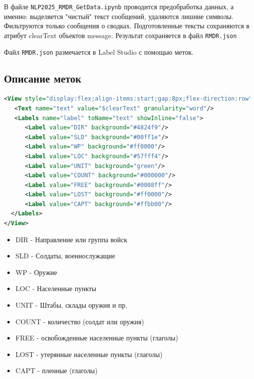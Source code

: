 \documentclass{article}
\begin{document}
В файле \verb|NLP2025_RMDR_GetData.ipynb| проводится предобработка данных, а именно: выделяется "чистый" текст сообщений, удаляются лишние символы. Фильтруются только сообщения о сводках. Подготовленные тексты сохраняются в атрибут clearText объектов message. Результат сохраняется в файл \verb|RMDR.json|

Файл \verb|RMDR.json| размечается в Label Studio с помощью меток.

\subsection*{Описание меток}



\begin{lstlisting}[language=XML]
<View style="display:flex;align-items:start;gap:8px;flex-direction:row">
   <Text name="text" value="$clearText" granularity="word"/>
   <Labels name="label" toName="text" showInline="false">
      <Label value="DIR" background="#4824f9"/>
      <Label value="SLD" background="#00ff1e"/>
      <Label value="WP" background="#ff0000"/>
      <Label value="LOC" background="#57fff4"/>
      <Label value="UNIT" background="green"/>
      <Label value="COUNT" background="#000000"/>
      <Label value="FREE" background="#0008ff"/>
      <Label value="LOST" background="#ff0000"/>
      <Label value="CAPT" background="#ffbb00"/>
  </Labels>
</View>
\end{lstlisting}



\begin{itemize}
  \item DIR - Направление или группа войск
  \item SLD - Солдаты, военнослужащие
  \item WP - Оружие 
  \item LOC - Населенные пункты
  \item UNIT - Штабы, склады оружия и пр.
  \item COUNT - количество (солдат или оружия)
  \item FREE - освобожденные населенные пункты (глаголы)
  \item LOST - утерянные населенные пункты (глаголы)
  \item CAPT - пленные (глаголы)
\end{itemize}
\end{document}
